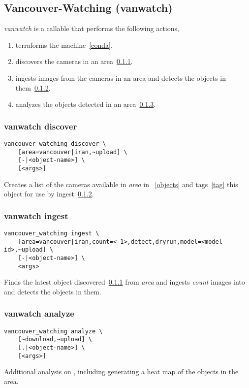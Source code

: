 \subsection{Vancouver-Watching (vanwatch)}
\label{vanwatch}

\emph{vanwatch} is a callable that performs the following actions,
%
\begin{enumerate}
    \item{terraforms the machine~\ref{conda}.}
    \item{discovers the cameras in an area~\ref{vanwatch_discover}.}
    \item{ingests images from the cameras in an area and detects the objects in them~\ref{vanwatch_ingest}.}
    \item{analyzes the objects detected in an area~\ref{vanwatch_analyze}.}
\end{enumerate}

\subsubsection{vanwatch discover}
\label{vanwatch_discover}

\begin{verbatim}
vancouver_watching discover \
    [area=vancouver|iran,~upload] \
    [-|<object-name>] \
    [<args>]
\end{verbatim}
%
Creates a list of the cameras available in \emph{area} in ~\ref{objects} and tags~\ref{tag} this object for use by ingest~\ref{vanwatch_ingest}.

\subsubsection{vanwatch ingest}
\label{vanwatch_ingest}

\begin{verbatim}
vancouver_watching ingest \
    [area=vancouver|iran,count=<-1>,detect,dryrun,model=<model-id>,~upload] \
    [-|<object-name>] \
    <args>
\end{verbatim}
%
Finds the latest object discovered~\ref{vanwatch_discover} from \emph{area} and ingests \emph{count} images into  and detects the objects in them.

\subsubsection{vanwatch analyze}
\label{vanwatch_analyze}

\begin{verbatim}
vancouver_watching analyze \
    [~download,~upload] \
    [.|<object-name>] \
    [<args>]
\end{verbatim}
%
Additional analysis on , including generating a heat map of the objects in the area.